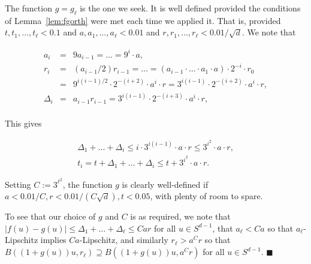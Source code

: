 \documentclass[11pt]{article}%
\newenvironment{proofof}[1]{\vspace{1ex}\noindent{\bf Proof of #1.}}{\hspace*{\fill}$\blacksquare$\vspace{1ex}}
\begin{document}
\begin{proofof}{Lemma~\ref{lem:fg}}
\noindent
The function $g = g_{\ell}$ is the one we seek. It is well defined 
provided the conditions of Lemma~\ref{lem:fgorth} were met each time 
we applied it. That is, provided 
$t, t_1, \dots, t_{\ell} < 0.1$ and $a, a_1, \dots, a_{\ell} < 0.01$ 
and $r, r_1, \dots, r_{\ell} < 0.01/\sqrt{d}$. 
We note that 

$$ \begin{array}{rcl} 
a_{i} & = & 9 a_{i-1} = \dots = 9^{i}\cdot a, \\[2ex]
r_i & = & (a_{i-1}/2) r_{i-1} = \dots = (a_{i-1}\cdot\dots\cdot a_1\cdot a)\cdot 2^{-i}\cdot r_0\\[1.5ex]
& = &  
9^{i(i-1)/2} \cdot 2^{-(i+2)} \cdot a^i \cdot r
= 3^{i(i-1)}\cdot 2^{-(i+2)} \cdot a^i \cdot r, \\[2ex]
\Delta_i & = & a_{i-1} r_{i-1} = 3^{i(i-1)} \cdot 2^{-(i+3)} \cdot a^{i} \cdot r, \\[2ex]
\end{array} $$ 

\noindent
This gives 

$$ \begin{array}{l} 
\Delta_1 + \dots + \Delta_i \leq i \cdot 3^{i(i-1)}\cdot a \cdot r \leq 3^{i^2} \cdot a \cdot r,%
\\[2ex]
t_i = t + \Delta_1 + \dots + \Delta_i \leq t +  3^{i^2} \cdot a \cdot r. 
\end{array} $$


\noindent
Setting $C := 3^{\ell^2}$, the function $g$ is clearly well-defined if 
$a< 0.01/C, r < 0.01/(C\sqrt{d}), t < 0.05$, with plenty of room to spare.

To see that our choice of $g$ and $C$ is as required, we note that 
$|f(u)-g(u)| \leq \Delta_1+\dots+\Delta_\ell \leq C a r$ for all $u\in S^{d-1}$, that 
$a_{\ell} < C a$ so that $a_{\ell}$-Lipschitz implies $Ca$-Lipschitz, and 
similarly $r_{\ell} >a^C r$ so that
$B( (1+g(u)) u, r_{\ell} ) \supseteq B( (1+g(u))u, a^C r)$ for all $u\in S^{d-1}$.
% 
% 
% 
% 
% 
% 
\end{proofof}
\end{document}
